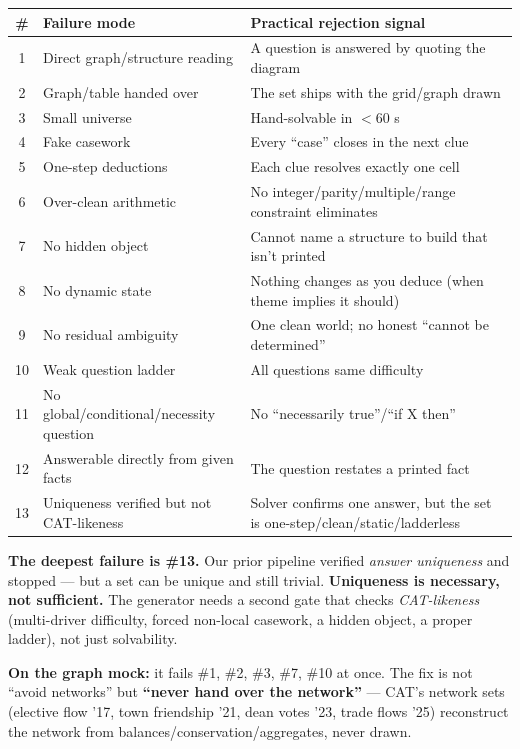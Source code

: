 \documentclass[11pt,a4paper]{article}
\begin{document}
\begin{center}
\begin{longtable}{c l p{11.5cm}}
\toprule
\textbf{\#} & \textbf{Failure mode} & \textbf{Practical rejection signal} \\
\midrule
\endhead
1 & Direct graph/structure reading & A question is answered by quoting the diagram \\
2 & Graph/table handed over & The set ships with the grid/graph drawn \\
3 & Small universe & Hand-solvable in $<60$ s \\
4 & Fake casework & Every ``case'' closes in the next clue \\
5 & One-step deductions & Each clue resolves exactly one cell \\
6 & Over-clean arithmetic & No integer/parity/multiple/range constraint eliminates \\
7 & No hidden object & Cannot name a structure to build that isn't printed \\
8 & No dynamic state & Nothing changes as you deduce (when theme implies it should) \\
9 & No residual ambiguity & One clean world; no honest ``cannot be determined'' \\
10 & Weak question ladder & All questions same difficulty \\
11 & No global/conditional/necessity question & No ``necessarily true''/``if X then'' \\
12 & Answerable directly from given facts & The question restates a printed fact \\
13 & Uniqueness verified but not CAT-likeness & Solver confirms one answer, but the set is one-step/clean/static/ladderless \\
\bottomrule
\end{longtable}
\end{center}

\textbf{The deepest failure is \#13.} Our prior pipeline verified \emph{answer uniqueness} and stopped --- but a set can be unique and still trivial. \textbf{Uniqueness is necessary, not sufficient.} The generator needs a second gate that checks \emph{CAT-likeness} (multi-driver difficulty, forced non-local casework, a hidden object, a proper ladder), not just solvability.

\textbf{On the graph mock:} it fails \#1, \#2, \#3, \#7, \#10 at once. The fix is not ``avoid networks'' but \textbf{``never hand over the network''} --- CAT's network sets (elective flow ’17, town friendship ’21, dean votes ’23, trade flows ’25) reconstruct the network from balances/conservation/aggregates, never drawn.
\end{document}

